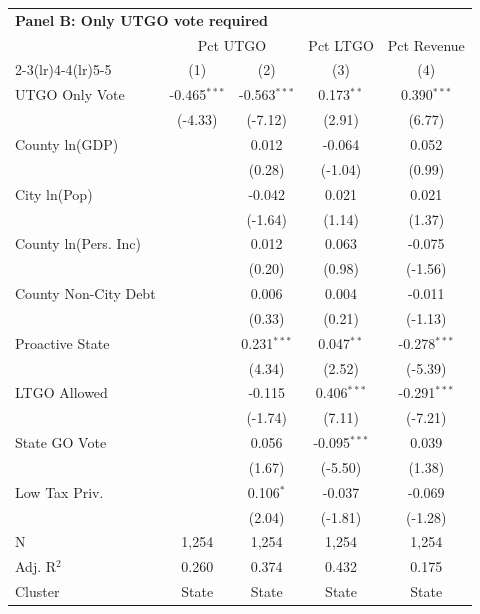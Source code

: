 \begingroup
\centering
\begin{tabular*}{\textwidth}{@{\extracolsep{\fill}}lcccc}
\multicolumn{5}{l}{\textbf{Panel B: Only UTGO vote required}}\\

\addlinespace
   \toprule
    & \multicolumn{2}{c}{Pct UTGO} & Pct LTGO & Pct Revenue\\
   \cmidrule(lr){2-3}\cmidrule(lr){4-4}\cmidrule(lr){5-5}
                        & (1)            & (2)            & (3)            & (4)\\  
   \midrule 
   UTGO Only Vote       & -0.465$^{***}$ & -0.563$^{***}$ & 0.173$^{**}$   & 0.390$^{***}$\\   
                        & (-4.33)       & (-7.12)       & (2.91)        & (6.77)\\   
   County ln(GDP)       &                & 0.012          & -0.064         & 0.052\\   
                        &                & (0.28)        & (-1.04)       & (0.99)\\   
   City ln(Pop)         &                & -0.042         & 0.021          & 0.021\\   
                        &                & (-1.64)       & (1.14)        & (1.37)\\   
   County ln(Pers. Inc) &                & 0.012          & 0.063          & -0.075\\   
                        &                & (0.20)        & (0.98)        & (-1.56)\\   
   County Non-City Debt &                & 0.006          & 0.004          & -0.011\\   
                        &                & (0.33)        & (0.21)        & (-1.13)\\   
   Proactive State      &                & 0.231$^{***}$  & 0.047$^{**}$   & -0.278$^{***}$\\   
                        &                & (4.34)        & (2.52)        & (-5.39)\\   
   LTGO Allowed         &                & -0.115         & 0.406$^{***}$  & -0.291$^{***}$\\   
                        &                & (-1.74)       & (7.11)        & (-7.21)\\   
   State GO Vote        &                & 0.056          & -0.095$^{***}$ & 0.039\\   
                        &                & (1.67)        & (-5.50)       & (1.38)\\   
   Low Tax Priv.        &                & 0.106$^{*}$    & -0.037         & -0.069\\   
                        &                & (2.04)        & (-1.81)       & (-1.28)\\   
   \hline
   N         & 1,254          & 1,254          & 1,254          & 1,254\\  
   Adj. R$^2$       & 0.260          & 0.374          & 0.432          & 0.175\\  
   Cluster              & State & State & State & State\\  
   \bottomrule
\end{tabular*}
\par\endgroup
